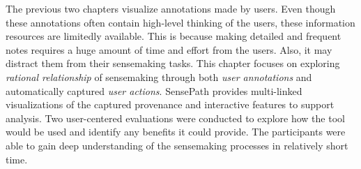 The previous two chapters visualize annotations made by users. Even though these annotations often contain high-level thinking of the users, these information resources are limitedly available. This is because making detailed and frequent notes requires a huge amount of time and effort from the users. Also, it may distract them from their sensemaking tasks. This chapter focuses on exploring \emph{rational relationship} of sensemaking through both \emph{user annotations} and automatically captured \emph{user actions}. SensePath provides multi-linked visualizations of the captured provenance and interactive features to support analysis. Two user-centered evaluations were conducted to explore how the tool would be used and identify any benefits it could provide. The participants were able to gain deep understanding of the sensemaking processes in relatively short time.






